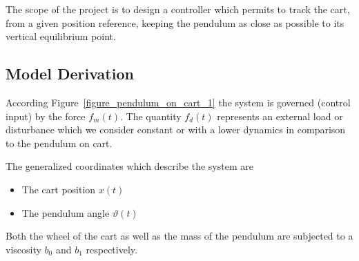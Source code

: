 \documentclass[12pt,a4paper,oneside]{book}
\begin{document}
\begin{onehalfspace}
The scope of the project is to design a controller which permits to track the cart, from a given position reference, keeping the pendulum as close as possible to its vertical equilibrium point.
\subsection{Model Derivation}
According Figure~\ref{figure_pendulum_on_cart_1} the system is governed (control input) by the force $f_m(t)$. The quantity $f_d(t)$ represents an external load or disturbance which we consider constant or with a lower dynamics in comparison to the pendulum on cart.

The generalized coordinates which describe the system are 
\begin{itemize}
	\item[--] The cart position $x(t)$
	\item[--] The pendulum angle $\vartheta(t)$
\end{itemize}
Both the wheel of the cart as well as the mass of the pendulum are subjected to a viscosity $b_0$ and $b_1$ respectively.


\end{onehalfspace}
\end{document}

